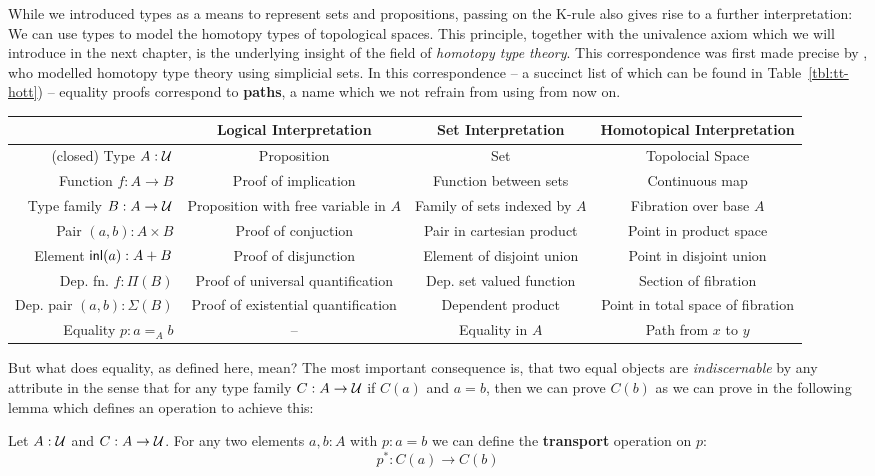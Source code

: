 While we introduced types as a means to represent sets and propositions,
passing on the K-rule also gives rise to a further interpretation:
We can use types to model the homotopy types of topological spaces.
This principle, together with the univalence axiom which we will introduce
in the next chapter, is the underlying insight of the field of \emph{homotopy type theory}.
This correspondence was first made precise by \cite{kapulkinlumsdaine},
who modelled homotopy type theory using simplicial sets.
In this correspondence -- a succinct list of which can be found in Table~\ref{tbl:tt-hott}) --
equality proofs correspond to \textbf{paths}, a name which we not refrain
from using from now on.

\begin{sidewaystable}
{\small
\begin{tabular}{r|ccc}
  & Logical Interpretation & Set Interpretation & Homotopical Interpretation \\
\hline
(closed) Type $A : \mathcal{U}$
  & Proposition
  & Set
  & Topolocial Space \\
Function $f : A \to B$
  & Proof of implication
  & Function between sets
  & Continuous map \\
Type family $B : A \to \mathcal{U}$
  & Proposition with free variable in $A$
  & Family of sets indexed by $A$
  & Fibration over base $A$ \\
Pair $(a, b) : A \times B$
  & Proof of conjuction
  & Pair in cartesian product
  & Point in product space \\
Element $\mathsf{inl}(a) : A + B$
  & Proof of disjunction
  & Element of disjoint union
  & Point in disjoint union \\
Dep. fn. $f : \Pi(B)$
  & Proof of universal quantification
  & Dep. set valued function
  & Section of fibration \\
Dep. pair $(a, b) : \Sigma(B)$
  & Proof of existential quantification
  & Dependent product
  & Point in total space of fibration \\
Equality $p : a =_A b$
  & --
  & Equality in $A$
  & Path from $x$ to $y$ \\
\end{tabular}}
\caption{Three interpretations}\label{tbl:tt-hott}
\end{sidewaystable}

But what does equality, as defined here, mean?
The most important consequence is, that two equal objects are \emph{indiscernable}
by any attribute in the sense that for any type family $C : A \to \mathcal{U}$ if
$C(a)$ and $a = b$, then we can prove $C(b)$ as we can prove in the following
lemma which defines an operation to achieve this:
\begin{lemma}[Transport]
Let $A : \mathcal{U}$ and $C : A \to \mathcal{U}$.
For any two elements $a, b : A$ with $p : a = b$ we can define the
\textbf{transport} operation on $p$:
\begin{equation*}
p^* : C(a) \to C(b)
\end{equation*}
\end{lemma}

